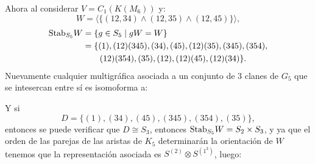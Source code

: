 \documentclass[12pt]{book}
\theoremstyle{definition}
\newcounter{in}
\begin{document}
Ahora al considerar $V = C_{1}(K(M_{6}))$ y:
$$W = \langle \{(12,34) \wedge (12,35) \wedge (12,45) \} \rangle,$$
\begin{equation*}
    \begin{aligned}
      \textup{Stab}_{S_{5}} W &=\{g\in S_{5}\mid gW=W\}\\
      &=\{(1),(12)(345), (34), (45), (12)(35), (345), (354),\\
      &\qquad{}(12)(354), (35), (12), (12)(45), (12)(34)\}.
    \end{aligned}
\end{equation*}
Nuevamente cualquier multigráfica asociada a un conjunto de $3$ clanes de $G_{5}$ que se intesercan entre sí es isomoforma a:
\begin{center}
\end{center}
Y si
\begin{equation*}
      D =\{(1), (34), (45), (345), (354), (35)\},
\end{equation*}
entonces se puede verificar que $D \cong S_{3}$, entonces $\textup{Stab}_{S_{5}} W = S_{2} \times S_{3}$,
y ya que el orden de las parejas de las aristas de $K_{5}$ determinarán la orientación de $W$ tenemos que la representación asociada es $S^{(2)} \otimes S^{(1^{3})}$, luego:
\end{document}
